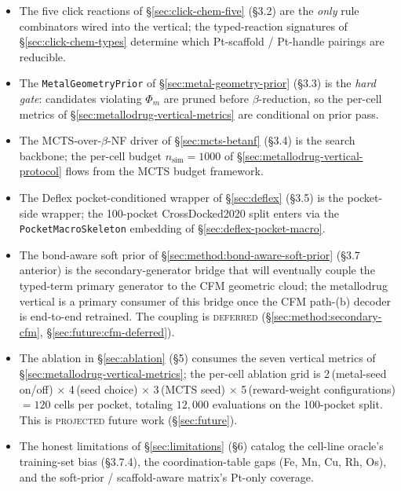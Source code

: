 \begin{itemize}
  \item The five click reactions of
        \S\ref{sec:click-chem-five} (\S3.2) are the
        \emph{only} rule combinators wired into the
        vertical; the typed-reaction signatures of
        \S\ref{sec:click-chem-types} determine which
        Pt-scaffold / Pt-handle pairings are reducible.

  \item The \texttt{MetalGeometryPrior} of
        \S\ref{sec:metal-geometry-prior} (\S3.3) is the
        \emph{hard gate}: candidates violating
        $\Phi_{m}$ are pruned before $\beta$-reduction, so
        the per-cell metrics of
        \S\ref{sec:metallodrug-vertical-metrics} are
        conditional on prior pass.

  \item The MCTS-over-$\beta$-NF driver of
        \S\ref{sec:mcts-betanf} (\S3.4) is the search
        backbone; the per-cell budget
        $n_\text{sim} = 1000$ of
        \S\ref{sec:metallodrug-vertical-protocol} flows
        from the MCTS budget framework.

  \item The Deflex pocket-conditioned wrapper of
        \S\ref{sec:deflex} (\S3.5) is the pocket-side
        wrapper; the 100-pocket CrossDocked2020 split
        enters via the \texttt{PocketMacroSkeleton}
        embedding of \S\ref{sec:deflex-pocket-macro}.

  \item The bond-aware soft prior of
        \S\ref{sec:method:bond-aware-soft-prior} (\S3.7
        anterior) is the secondary-generator bridge that
        will eventually couple the typed-term primary
        generator to the CFM geometric cloud; the
        metallodrug vertical is a primary consumer of this
        bridge once the CFM path-(b) decoder is end-to-end
        retrained. The coupling is \textsc{deferred}
        (\S\ref{sec:method:secondary-cfm},
        \S\ref{sec:future:cfm-deferred}).

  \item The ablation in \S\ref{sec:ablation} (\S5) consumes
        the seven vertical metrics of
        \S\ref{sec:metallodrug-vertical-metrics}; the
        per-cell ablation grid is
        2\,(metal-seed on/off) $\times$ 4\,(seed choice)
        $\times$ 3\,(MCTS seed) $\times$ 5\,(reward-weight
        configurations) $= 120$ cells per pocket, totaling
        $12{,}000$ evaluations on the 100-pocket split.
        This is \textsc{projected} future work
        (\S\ref{sec:future}).

  \item The honest limitations of
        \S\ref{sec:limitations} (\S6) catalog the cell-line
        oracle's training-set bias (\S3.7.4), the
        coordination-table gaps (Fe, Mn, Cu, Rh, Os), and
        the soft-prior / scaffold-aware matrix's Pt-only
        coverage.
\end{itemize}

